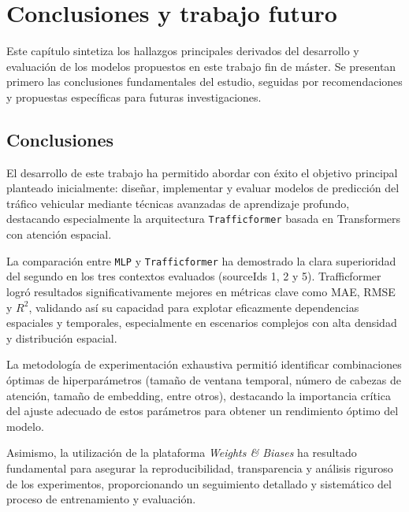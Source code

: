 \section*{Conclusiones y trabajo futuro}
\label{sec:conclusiones}

%
%

Este capítulo sintetiza los hallazgos principales derivados del desarrollo y evaluación de los modelos propuestos en este trabajo fin de máster. Se presentan primero las conclusiones fundamentales del estudio, seguidas por recomendaciones y propuestas específicas para futuras investigaciones.

\subsection{Conclusiones}

El desarrollo de este trabajo ha permitido abordar con éxito el objetivo principal planteado inicialmente: diseñar, implementar y evaluar modelos de predicción del tráfico vehicular mediante técnicas avanzadas de aprendizaje profundo, destacando especialmente la arquitectura \texttt{Trafficformer} basada en Transformers con atención espacial.

La comparación entre \texttt{MLP} y \texttt{Trafficformer} ha demostrado la clara superioridad del segundo en los tres contextos evaluados (sourceIds 1, 2 y 5). Trafficformer logró resultados significativamente mejores en métricas clave como MAE, RMSE y $R^2$, validando así su capacidad para explotar eficazmente dependencias espaciales y temporales, especialmente en escenarios complejos con alta densidad y distribución espacial.

La metodología de experimentación exhaustiva permitió identificar combinaciones óptimas de hiperparámetros (tamaño de ventana temporal, número de cabezas de atención, tamaño de embedding, entre otros), destacando la importancia crítica del ajuste adecuado de estos parámetros para obtener un rendimiento óptimo del modelo.

Asimismo, la utilización de la plataforma \textit{Weights & Biases} ha resultado fundamental para asegurar la reproducibilidad, transparencia y análisis riguroso de los experimentos, proporcionando un seguimiento detallado y sistemático del proceso de entrenamiento y evaluación.

